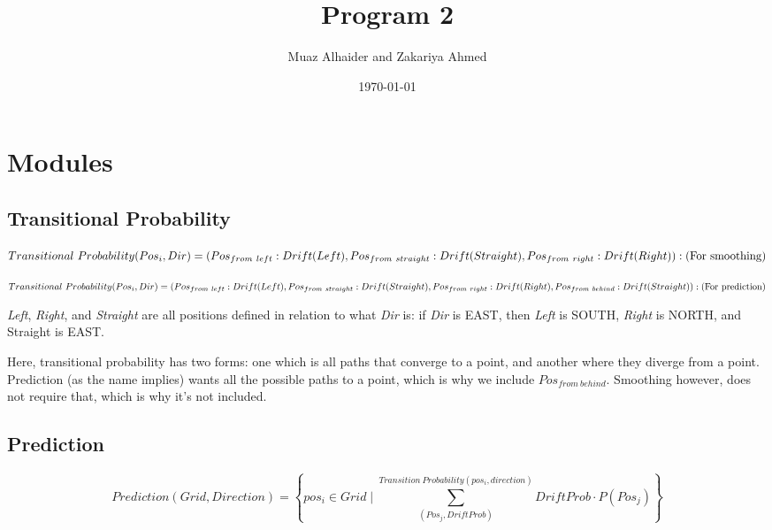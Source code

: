 \documentclass[11pt]{article}
\author{Muaz Alhaider and Zakariya Ahmed}
\date{\today}
\title{Program 2}
\begin{document}
\maketitle

\section*{Modules}
\label{sec:org615d8b7}

\subsection*{Transitional Probability}
\label{sec:org4f6c62e}
   \begin{math}
    Transitional\ Probability(Pos_i, Dir) = \\
     (Pos_{from\ left}:Drift(Left), Pos_{from\ straight}:Drift(Straight), Pos_{from\ right}:Drift(Right)): (\text{For smoothing})
\end{math}

\newline
\begin{math}
\\ \\
Transitional\ Probability(Pos_i, Dir) =\\ (Pos_{from\ left}:Drift(Left), Pos_{from\ straight}:Drift(Straight), Pos_{from\ right}:Drift(Right), Pos_{from\ behind}:Drift(Straight)): (\text{For prediction})
\\ \\
\end{math}


\emph{Left}, \emph{Right}, and \emph{Straight} are all positions defined in relation to what \emph{Dir} is: if \emph{Dir} is EAST, then \emph{Left} is SOUTH, \emph{Right} is NORTH, and Straight is EAST.

Here, transitional probability has two forms: one which is all paths that converge to a point, and another where they diverge from a point. Prediction (as the name implies) wants all the possible paths to a point, which is why we include \(Pos_{from\ behind}\). Smoothing however, does not require that, which is why it's not included.


\subsection*{Prediction}
\label{sec:org0947aab}
$$Prediction(Grid, Direction) = \left\{pos_i \in Grid \mid \sum^{Transition\ Probability(pos_i, direction)}_{(Pos_j, DriftProb)} DriftProb \cdot P(Pos_j) \right \}$$
\end{document}
